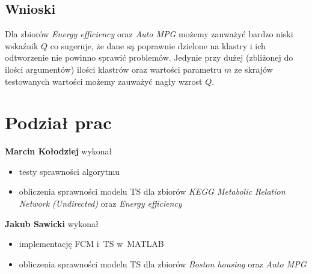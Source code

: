 \documentclass[a4paper; 11pt]{article}
\begin{document}
\subsection{Wnioski}
Dla zbiorów \emph{Energy efficiency} oraz \emph{Auto MPG} możemy zauważyć bardzo niski wskaźnik $Q$ co sugeruje,
że dane są poprawnie dzielone na klastry i ich odtworzenie nie powinno sprawić problemów. Jedynie przy dużej
(zbliżonej do ilości argumentów) ilości klastrów oraz wartości parametru $m$ ze skrajów testowanych wartości
możemy zauważyć nagły wzrost $Q$.

\section{Podział prac}

\textbf{Marcin Kołodziej} wykonał
\begin{itemize}
\item testy sprawności algorytmu
\item obliczenia sprawności modelu TS dla zbiorów \emph{KEGG Metabolic Relation Network (Undirected)} oraz \emph{Energy efficiency}
\end{itemize}

\textbf{Jakub Sawicki} wykonał
\begin{itemize}
\item implementację FCM i~TS w~MATLAB
\item obliczenia sprawności modelu TS dla zbiorów \emph{Boston housing} oraz \emph{Auto MPG}
\end{itemize}
\end{document}
